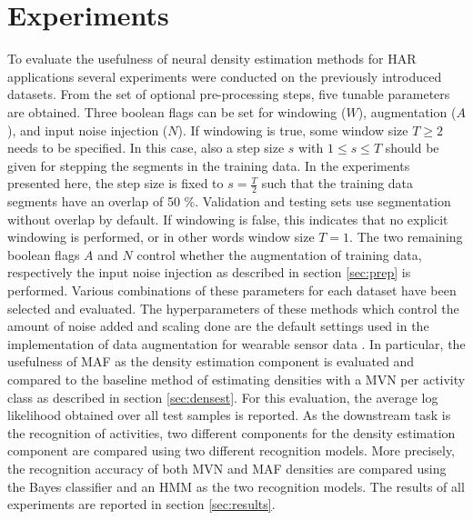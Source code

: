 \documentclass[11pt,titlepage,oneside,openany]{book}
\begin{document}
\section{Experiments}
\label{sec:exp}
To evaluate the usefulness of neural density estimation methods for HAR applications several experiments were conducted on the previously introduced datasets. From the set of optional pre-processing steps, five tunable parameters are obtained. Three boolean flags can be set for windowing ($W$), augmentation ($A$), and input noise injection ($N$). If windowing is true, some window size $T \geq 2$ needs to be specified. In this case, also a step size $s$ with $1 \leq s \leq T$ should be given for stepping the segments in the training data. In the experiments presented here, the step size is fixed to $s = \frac{T}{2}$ such that the training data segments have an overlap of 50 \%. Validation and testing sets use segmentation without overlap by default. If windowing is false, this indicates that no explicit windowing is performed, or in other words window size $T = 1$. The two remaining boolean flags $A$ and $N$ control whether the augmentation of training data, respectively the input noise injection as described in section \ref{sec:prep} is performed. Various combinations of these parameters for each dataset have been selected and evaluated. The hyperparameters of these methods which control the amount of noise added and scaling done are the default settings used in the implementation of data augmentation for wearable sensor data \cite{um_augmentation_2017}. In particular, the usefulness of MAF as the density estimation component is evaluated and compared to the baseline method of estimating densities with a MVN per activity class as described in section \ref{sec:densest}. For this evaluation, the average log likelihood obtained over all test samples is reported. As the downstream task is the recognition of activities, two different components for the density estimation component are compared using two different recognition models. More precisely, the recognition accuracy of both MVN and MAF densities are compared using the Bayes classifier and an HMM as the two recognition models. The results of all experiments are reported in section \ref{sec:results}.
\end{document}
